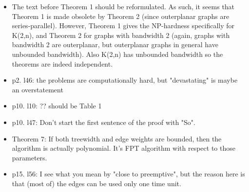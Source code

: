 \documentclass[11pt,a4paper]{article}
\begin{document}
\begin{itemize}

\item The text before Theorem 1 should be reformulated. As such, it seems that
Theorem 1 is made obsolete by Theorem 2 (since outerplanar graphs are
series-parallel).  However, Theorem 1 gives the NP-hardness specifically for
K(2,n), and Theorem 2 for graphs with bandwidth 2 (again, graphs with bandwidth
2 are outerplanar, but outerplanar graphs in general have unbounded bandwidth).
Also K(2,n) has unbounded bandwidth so the theorems are indeed independent.


\item p2.  l46: the problems are computationally hard, but "devastating" is maybe
            an overstatement
\item p10. l10: ?? should be Table 1
\item p10. l47: Don't start the first sentence of the proof with "So".
\item Theorem 7: If both treewidth and edge weights are bounded, then the algorithm
  is actually polynomial. It's FPT algorithm with respect to those parameters.
\item p15. l56: I see what you mean by "close to preemptive", but the reason here is 
  that (most of) the edges can be used only one time unit.
  
\end{itemize}
\end{document}
